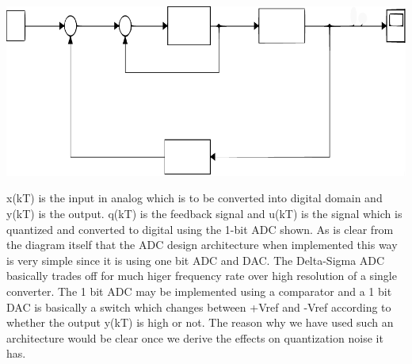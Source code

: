 \documentclass[colorlinks=true,pdfstartview=FitV,linkcolor=blue,
            citecolor=red,urlcolor=magenta]{ligodoc}
\begin{document}
\includegraphics[scale=0.5]{Delta_Sigma_ADC_Block1}

x(kT) is the input in analog which is to be converted into digital domain and y(kT) is the output. q(kT) is the feedback signal and u(kT) is the signal which is quantized and converted to digital using the 1-bit ADC shown.
As is clear from the diagram itself that the ADC design architecture when implemented this way is very simple since it is using one bit ADC and DAC. The Delta-Sigma ADC basically trades off for much higer frequency rate over high resolution of a single converter. The 1 bit ADC may be implemented using a comparator and a 1 bit DAC is basically a switch which changes between +Vref and -Vref according to whether the output y(kT) is high or not. The reason why we have used such an architecture would be clear once we derive the effects on quantization noise it has.
\end{document}
